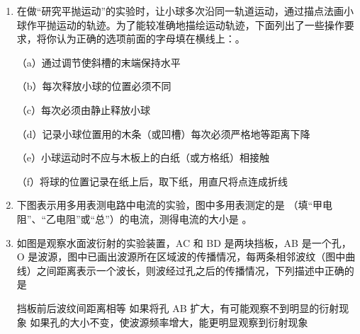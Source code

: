 \documentclass[\gkver]{gaokaozhenti}
\begin{document}
\begin{enumerate}
\jdanswer{
$1.4\UW$
}

\item
在做“研究平抛运动”的实验时，让小球多次沿同一轨道运动，通过描点法画小球作平抛运动的轨迹。为了能较准确地描绘运动轨迹，下面列出了一些操作要求，将你认为正确的选项前面的字母填在横线上：。

（a）通过调节使斜槽的末端保持水平

（b）每次释放小球的位置必须不同

（c）每次必须由静止释放小球

（d）记录小球位置用的木条（或凹槽）每次必须严格地等距离下降

（e）小球运动时不应与木板上的白纸（或方格纸）相接触

（f）将球的位置记录在纸上后，取下纸，用直尺将点连成折线


\item
下图表示用多用表测电路中电流的实验，图中多用表测定的是 （填“甲电阻”、“乙电阻”或“总”）的电流，测得电流的大小是 \tkanswer[1.8cm]{$50\UmA$}。

\onepicture[w=8cm, align=right]{}


\item
如图是观察水面波衍射的实验装置，AC 和 BD 是两块挡板，AB 是一个孔，O 是波源，图中已画出波源所在区域波的传播情况，每两条相邻波纹（图中曲线）之间距离表示一个波长，则波经过孔之后的传播情况，下列描述中正确的是

\onepicture[w=5cm]{}

{挡板前后波纹间距离相等}
{如果将孔 AB 扩大，有可能观察不到明显的衍射现象}
{如果孔的大小不变，使波源频率增大，能更明显观察到衍射现象}


\end{enumerate}
\end{document}
